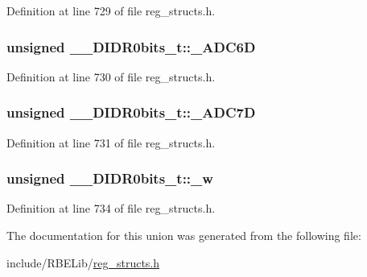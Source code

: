 Definition at line 729 of file reg\+\_\+structs.\+h.

\hypertarget{union_____d_i_d_r0bits__t_ac2001b8027266277149204eb8db5a6dc}{
\subsubsection[{\+\_\+\+A\+D\+C6\+D}]{\setlength{\rightskip}{0pt plus 5cm}unsigned \+\_\+\+\_\+\+D\+I\+D\+R0bits\+\_\+t\+::\+\_\+\+A\+D\+C6\+D}}\label{union_____d_i_d_r0bits__t_ac2001b8027266277149204eb8db5a6dc}


Definition at line 730 of file reg\+\_\+structs.\+h.

\hypertarget{union_____d_i_d_r0bits__t_ad8b0903c038e95899497c2c463e09ff8}{
\subsubsection[{\+\_\+\+A\+D\+C7\+D}]{\setlength{\rightskip}{0pt plus 5cm}unsigned \+\_\+\+\_\+\+D\+I\+D\+R0bits\+\_\+t\+::\+\_\+\+A\+D\+C7\+D}}\label{union_____d_i_d_r0bits__t_ad8b0903c038e95899497c2c463e09ff8}


Definition at line 731 of file reg\+\_\+structs.\+h.

\hypertarget{union_____d_i_d_r0bits__t_abec234de65b83769f89486810f8237fe}{
\subsubsection[{\+\_\+w}]{\setlength{\rightskip}{0pt plus 5cm}unsigned \+\_\+\+\_\+\+D\+I\+D\+R0bits\+\_\+t\+::\+\_\+w}}\label{union_____d_i_d_r0bits__t_abec234de65b83769f89486810f8237fe}


Definition at line 734 of file reg\+\_\+structs.\+h.



The documentation for this union was generated from the following file\+:\begin{DoxyCompactItemize}
\item 
include/\+R\+B\+E\+Lib/\hyperlink{reg__structs_8h}{reg\+\_\+structs.\+h}\end{DoxyCompactItemize}
